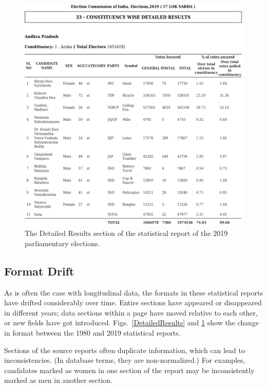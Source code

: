 \begin{figure}[h!]
  \centering
  \includegraphics[width=\linewidth]{LS17_DR.png}
  \caption{The Detailed Results section of the statistical report of the 2019 parliamentary elections.}
  \label{DetailedResults17}
\end{figure}

\subsection{Format Drift}

As is often the case with longitudinal data, the formats in these statistical reports have drifted considerably over time. Entire sections have appeared or disappeared in different years; data sections within a page have moved relative to each other, or new fields have got introduced. Figs.~\ref{DetailedResults} and \ref{DetailedResults17}  show the change in format between the 1980 and 2019 statistical reports.

Sections of the source reports often duplicate information, which can lead to inconsistencies. (In database terms, they are non-normalized.) For examples, candidates marked as women in one section of the report may be inconsistently marked as men in another section.

